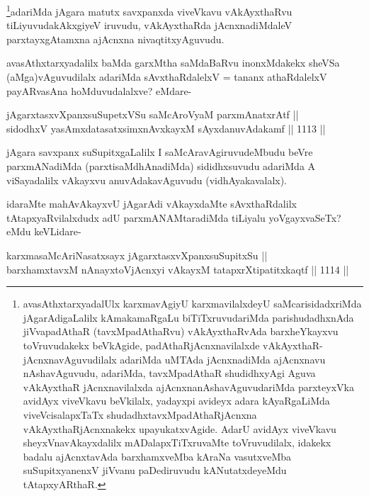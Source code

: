 \begin{artha}
\footnote{avasAthxtarxyadalUlx karxmavAgiyU karxmavilalxdeyU saMcarisidadxriMda jAgarAdigaLalilx kAmakamaRgaLu biTiTxruvudariMda parishudadhxnAda jiVvapadAthaR (tavxMpadAthaRvu) vAkAyxthaRvAda barxheYkayxvu toVruvudakekx beVkAgide, padAthaRjAcnxnavilalxde vAkAyxthaR- jAcnxnavAguvudilalx adariMda uMTAda jAcnxnadiMda ajAcnxnavu nAshavAguvudu, adariMda, tavxMpadAthaR shudidhxyAgi Aguva vAkAyxthaR jAcnxnavilalxda ajAcnxnanAshavAguvudariMda parxteyxVka avidAyx viveVkavu beVkilalx, yadayxpi avideyx adara kAyaRgaLiMda viveVcisalapxTaTx shudadhxtavxMpadAthaRjAcnxna vAkAyxthaRjAcnxnakekx upayukatxvAgide. AdarU avidAyx viveVkavu sheyxVnavAkayxdalilx mADalapxTiTxruvaMte toVruvudilalx, idakekx badalu ajAcnxtavAda barxhamxveMba kAraNa vasutxveMba suSupitxyanenxV jiVvanu paDediruvudu kANutatxdeyeMdu tAtapxyARthaR.}adariMda jAgara matutx savxpanxda viveVkavu vAkAyxthaRvu tiLiyuvudakAkxgiyeV iruvudu, vAkAyxthaRda jAcnxnadiMdaleV parxtayxgAtamxna ajAcnxna nivaqtitxyAguvudu.
\end{artha}


\begin{artha}
avasAthxtarxyadalilx baMda garxMtha saMdaBaRvu inonxMdakekx sheVSa (aMga)vAguvudilalx adariMda sAvxthaRdalelxV = tananx athaRdalelxV payARvasAna hoMduvudalalxve? eMdare-
\end{artha}

\begin{shl}
jAgarxtasxvXpanxsuSupetxVSu saMcAroV\s yaM parxmAnatxrAtf ||  \\
sidodhxV yasAmxdatasatxsimxnAvxkayxM sAyxdanuvAdakamf \hfill || 1113 ||  
\end{shl}

\begin{artha}
jAgara savxpanx suSupitxgaLalilx I saMcAravAgiruvudeMbudu beVre parxmANadiMda (parxtisaMdhAnadiMda) sididhxsuvudu adariMda A viSayadalilx vAkayxvu anuvAdakavAguvudu (vidhAyakavalalx).
\end{artha}

\begin{artha}
idaraMte mahAvAkayxvU jAgarAdi vAkayxdaMte sAvxthaRdalilx tAtapxyaRvilalxdudx adU parxmANAMtaradiMda tiLiyalu yoVgayxvaSeTx? eMdu keVLidare-
\end{artha}


\begin{shl}
karxmasaMcAriNasatxsayx jAgarxtasxvXpanxsuSupitxSu || \\
barxhamxtavxM nAnayxtoV\s jAcnxyi vAkayxM tatapxrXtipatitxkaqtf \hfill || 1114 ||  
\end{shl}

